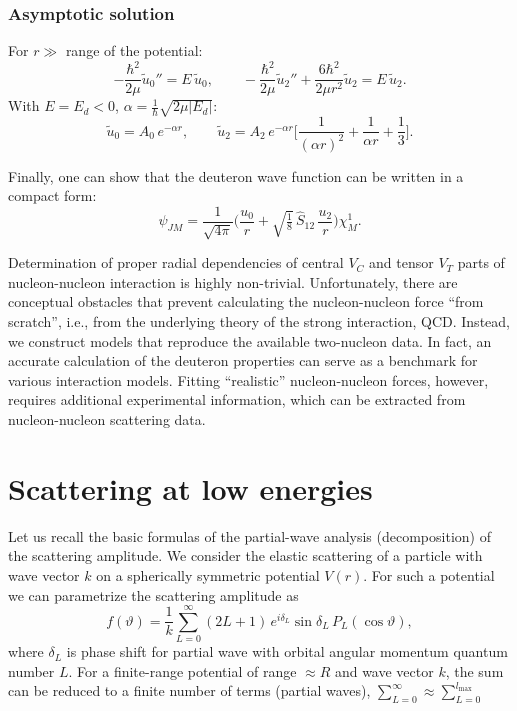 \documentclass[11pt,a4paper]{article}
\newcommand{\op}[1]{\hat{#1}}
\begin{document}
\subsubsection*{Asymptotic solution}

For $r\gg$ range of the potential:
\[
-\frac{\hbar^2}{2\mu}\tilde u_0''=E\,\tilde u_0,\qquad
-\frac{\hbar^2}{2\mu}\tilde u_2''+\frac{6\hbar^2}{2\mu r^2}\tilde u_2=E\,\tilde u_2 .
\]
With $E=E_d<0$, $\alpha=\frac1\hbar\sqrt{2\mu|E_d|}$:
\[
\tilde u_0=A_0\,e^{-\alpha r},\qquad
\tilde u_2=A_2\,e^{-\alpha r}\Big[\frac{1}{(\alpha r)^2}+\frac{1}{\alpha r}+\frac13\Big].
\]

Finally, one can show that the deuteron wave function can be written in a
compact form:
\[
\psi_{JM}=\frac{1}{\sqrt{4\pi}}\Big(\frac{u_0}{r}+\sqrt{\tfrac18}\,\op S_{12}\,\frac{u_2}{r}\Big)\chi^1_M .
\]

Determination of proper radial dependencies of central $V_C$ and tensor $V_T$ parts of nucleon-nucleon interaction is highly non-trivial. Unfortunately, there are conceptual obstacles that prevent calculating the nucleon-nucleon force ``from scratch'', i.e., from the underlying theory of the strong interaction, QCD. Instead, we construct models that reproduce the available two-nucleon data. In fact, an accurate calculation of the deuteron properties can serve as a benchmark for various interaction models. Fitting ``realistic'' nucleon-nucleon forces, however, requires additional experimental information, which can be extracted from nucleon-nucleon scattering data. 

\section{Scattering at low energies}
Let us recall the basic formulas of the partial-wave analysis (decomposition) of the scattering amplitude. We consider the elastic scattering of a particle with wave vector $k$ on a spherically symmetric potential $V(r)$. For such a potential we can parametrize the scattering amplitude as 
\[
f(\vartheta)=\frac1k\sum_{L=0}^{\infty}(2L+1)\,e^{i\delta_L}\sin\delta_L\,P_L(\cos\vartheta),
\]
where $\delta_L$ is phase shift for partial wave with orbital angular momentum quantum number $L$. 
For a finite-range potential of range $\approx R$ and wave vector $k$, the sum can be reduced to a finite number of terms (partial waves), $\displaystyle\sum_{L=0}^{\infty}\approx\sum_{L=0}^{l_{\max}}$
\end{document}

